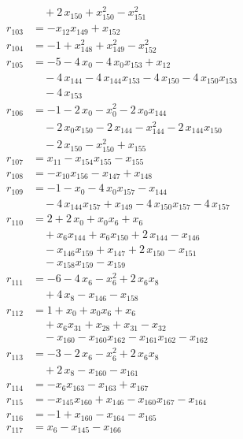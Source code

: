 \begin{align*}
&\quad{}+ 2\,x_{150} + x_{150}^{2} - x_{151}^{2} \\
r_{103} &= -x_{12} x_{149} + x_{152} \\
r_{104} &= -1 + x_{148}^{2} + x_{149}^{2} - x_{152}^{2} \\
r_{105} &= -5 - 4\,x_{0} - 4\,x_{0} x_{153} + x_{12} \\
&\quad{}- 4\,x_{144} - 4\,x_{144} x_{153} - 4\,x_{150} - 4\,x_{150} x_{153} \\
&\quad{}- 4\,x_{153} \\
r_{106} &= -1 - 2\,x_{0} - x_{0}^{2} - 2\,x_{0} x_{144} \\
&\quad{}- 2\,x_{0} x_{150} - 2\,x_{144} - x_{144}^{2} - 2\,x_{144} x_{150} \\
&\quad{}- 2\,x_{150} - x_{150}^{2} + x_{155} \\
r_{107} &= x_{11} - x_{154} x_{155} - x_{155} \\
r_{108} &= -x_{10} x_{156} - x_{147} + x_{148} \\
r_{109} &= -1 - x_{0} - 4\,x_{0} x_{157} - x_{144} \\
&\quad{}- 4\,x_{144} x_{157} + x_{149} - 4\,x_{150} x_{157} - 4\,x_{157} \\
r_{110} &= 2 + 2\,x_{0} + x_{0} x_{6} + x_{6} \\
&\quad{}+ x_{6} x_{144} + x_{6} x_{150} + 2\,x_{144} - x_{146} \\
&\quad{}- x_{146} x_{159} + x_{147} + 2\,x_{150} - x_{151} \\
&\quad{}- x_{158} x_{159} - x_{159} \\
r_{111} &= -6 - 4\,x_{6} - x_{6}^{2} + 2\,x_{6} x_{8} \\
&\quad{}+ 4\,x_{8} - x_{146} - x_{158} \\
r_{112} &= 1 + x_{0} + x_{0} x_{6} + x_{6} \\
&\quad{}+ x_{6} x_{31} + x_{28} + x_{31} - x_{32} \\
&\quad{}- x_{160} - x_{160} x_{162} - x_{161} x_{162} - x_{162} \\
r_{113} &= -3 - 2\,x_{6} - x_{6}^{2} + 2\,x_{6} x_{8} \\
&\quad{}+ 2\,x_{8} - x_{160} - x_{161} \\
r_{114} &= -x_{6} x_{163} - x_{163} + x_{167} \\
r_{115} &= -x_{145} x_{160} + x_{146} - x_{160} x_{167} - x_{164} \\
r_{116} &= -1 + x_{160} - x_{164} - x_{165} \\
r_{117} &= x_{6} - x_{145} - x_{166} \\

\end{align*}
